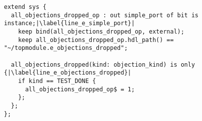 \lstset{language=e, numbers = left, escapechar=|, breaklines=true}
\begin{lstlisting}[frame=htrbl, caption={\textit{e}: signaling master component that all objections are dropped},
label={lst:e_slave_test_end}]
extend sys {
  all_objections_dropped_op : out simple_port of bit is instance;|\label{line_e_simple_port}|
    keep bind(all_objections_dropped_op, external);
    keep all_objections_dropped_op.hdl_path() == "~/topmodule.e_objections_dropped";
    
  all_objections_dropped(kind: objection_kind) is only {|\label{line_e_objections_dropped}|
    if kind == TEST_DONE {
      all_objections_dropped_op$ = 1;
    };
  };
};
\end{lstlisting}